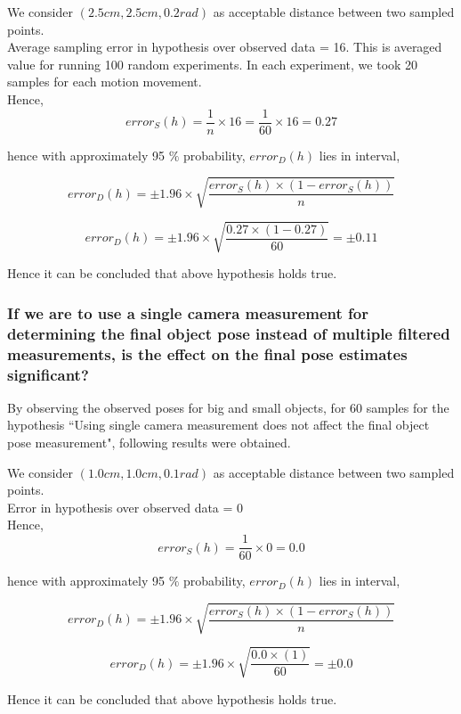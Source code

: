 \vspace{0.5cm}

We consider $(2.5 cm, 2.5cm, 0.2 rad)$ as acceptable distance between two sampled points.\\
Average sampling error in hypothesis over observed data = 16. This is averaged value for running 100 random experiments. In each experiment, we took 20 samples for each motion movement.
\\
Hence,
\\
$$error_{S}(h) = \frac{1}{n} \times 16 = \frac{1}{60} \times 16 = 0.27$$

hence with approximately 95 $\%$ probability,
$error_{D}(h)$ lies in interval,

$$error_{D}(h) = \pm 1.96 \times \sqrt{\frac{error_{S}(h) \times (1 - error_{S}(h))}{n}} $$

$$error_{D}(h) = \pm 1.96 \times \sqrt{\frac{0.27 \times (1 - 0.27)}{60}} = \pm 0.11$$

Hence it can be concluded that above hypothesis holds true. 



\subsubsection{If we are to use a single camera measurement for determining the final object pose instead of multiple filtered measurements, is the effect on the final pose estimates significant?}

By observing the observed poses for big and small objects, for 60 samples for the hypothesis ``Using single camera measurement does not affect the final object pose measurement", following results were obtained.

\vspace{0.5cm}
We consider $(1.0 cm, 1.0cm, 0.1 rad)$ as acceptable distance between two sampled points.\\
Error in hypothesis over observed data = 0
\\
Hence,
\\
$$error_{S}(h) = \frac{1}{60} \times 0 = 0.0$$

hence with approximately 95 $\%$ probability,
$error_{D}(h)$ lies in interval,

$$error_{D}(h) = \pm 1.96 \times \sqrt{\frac{error_{S}(h) \times (1 - error_{S}(h))}{n}} $$

$$error_{D}(h) = \pm 1.96 \times \sqrt{\frac{0.0 \times (1)}{60}} = \pm 0.0$$

Hence it can be concluded that above hypothesis holds true. 

